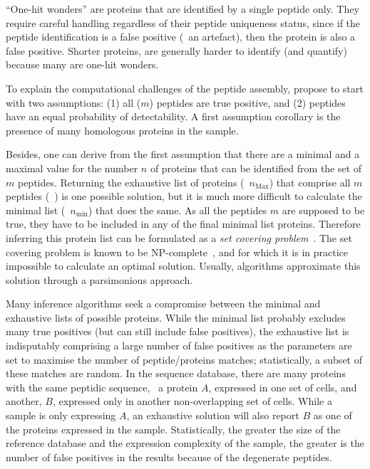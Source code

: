 \enquote{One-hit wonders} are proteins
that are identified by a single peptide only.
They require careful handling regardless of their peptide uniqueness status,
since if the peptide identification is a false positive (\ie\ an artefact),
then the protein is also a false positive.
Shorter proteins,
are generally harder to identify (and quantify)
because many are one-hit wonders.\mybr\

To explain the computational challenges of the peptide assembly,
\citet{Huang2012-nr} propose to start with two assumptions:
(1) all ($m$) peptides are true positive,
and (2) peptides have an equal probability of detectability.
A first assumption corollary is
the presence of many homologous proteins in the sample.\mybr\

Besides, one can derive from the first assumption
that there are a minimal and a maximal value
for the number $n$ of proteins that can be identified
from the set of $m$ peptides.
Returning the exhaustive list of proteins (\ie\ $n_\text{Max}$)
that comprise all $m$ peptides (\eg\ \citet{Tabb2002-wm}) is one possible solution,
but it is much more difficult to calculate the minimal list
(\ie\ $n_\text{min}$) that does the same.
As all the peptides $m$ are supposed to be true,
they have to be included in any of the final minimal list proteins.
Therefore inferring this protein list can be formulated
as a \emph{set covering problem}~.
The set covering problem is known to be \gls{NP}-complete~,
and for which it is in practice impossible to calculate an optimal solution.
Usually, algorithms approximate this solution through a parsimonious approach.\mybr\

Many inference algorithms seek
a compromise between the minimal and exhaustive lists of possible proteins.
While the minimal list probably excludes many true positives
(but can still include false positives),
the exhaustive list is indisputably comprising a large number of false positives
as the parameters are set to maximise the number of peptide/proteins matches;
statistically, a subset of these matches are random.
In the sequence database,
there are many proteins with the same peptidic sequence,
\eg\ a protein $A$, expressed in one set of cells, and
another, $B$, expressed only in another non-overlapping set of cells.
While a sample is only expressing $A$,
an exhaustive solution will also report
$B$ as one of the proteins expressed in the sample.
Statistically,
the greater the size of the reference database
and the expression complexity of the sample,
the greater is the number of false positives in the results
because of the degenerate peptides.\mybr\

